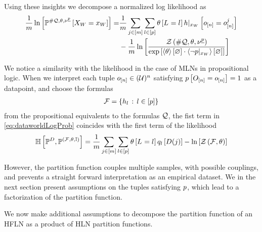 Using these insights we decompose a normalized log likelihood as
\begin{align}
    \label{eq:dataworldLogProb}
    \frac{1}{m} \ln \left[ \mathbb{P}^{\#\mathcal{Q},\theta,\nu^{\underline{p}}}\left[X_{W}=x_{W}\right] \right]
    = & \frac{1}{m} \sum_{j\in[m]} \sum_{l\in[p]} \theta\left[L_{}=l_{}\right]
    {h}|_{x_{W}} \left[o_{[n]} = o_{[n]}^{j}\right] \\
    & - \frac{1}{m} \ln \left[ 
        \frac{\mathcal{Z}\left(\#\mathcal{Q},\theta,\nu^{\underline{p}}\right)}{
            \mathrm{exp}\left[\left\langle \theta\right\rangle \left[ \varnothing \right] \cdot \left\langle {\lnot p}|_{x_{W}}\right\rangle \left[ \varnothing \right]\right]
        }
     \right]
\end{align}

We notice a similarity with the likelihood in the case of MLNs in propositional logic.
When we interpret each tuple $o_{[n]}\in(\mathcal{U})^{n}$ satisfying $p\left[O_{[n]}=o_{[n]}\right]=1$ as a datapoint, and choose the formulas
\begin{align*}
    \mathcal{F} = \{h_{l} \, : \, l\in[p] \}
\end{align*}
from the propositional equivalents to the formulas $\mathcal{Q}$, the fist term in \eqref{eq:dataworldLogProb} coincides with the first term of the likelihood
\begin{align*}
    \mathbb{H}\left[\mathbb{P}^{D},\mathbb{P}^{(\mathcal{F},\theta,\mathbb{I})}\right]
    = \frac{1}{m}\sum_{j\in[m]} \sum_{l\in[p]} \theta\left[L_{}=l_{}\right] q_{l}\left[D(j)\right] - \ln \left[ \mathcal{Z}\left(\mathcal{F},\theta\right) \right]
\end{align*}

However, the partition function couples multiple samples, with possible couplings, and prevents a straight forward interpretation as an empirical dataset.
We in the next section present assumptions on the tuples satisfying $p$, which lead to a factorization of the partition function.



We now make additional assumptions to decompose the partition function of an HFLN as a product of HLN partition functions.

